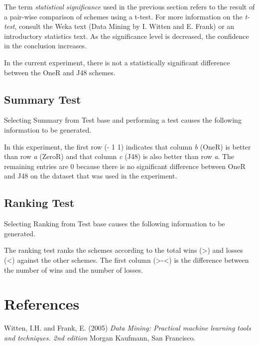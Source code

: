 \documentclass[a4paper]{article}
\begin{document}
The term \textit{statistical significance} used in the previous section refers to the result of a pair-wise comparison of schemes using a t-test. For more information on the \textit{t-test}, consult the Weka text (Data Mining by I. Witten and E. Frank) or an introductory statistics text. As the significance level is decreased, the confidence in the conclusion increases.

In the current experiment, there is not a statistically significant difference between the OneR and J48 schemes.


\subsection{Summary Test}

Selecting Summary from Test base and performing a test causes the following information to be generated.
\begin{center}
\end{center}

In this experiment, the first row (- 1 1) indicates that column \textit{b} (OneR) is better than row \textit{a} (ZeroR) and that column \textit{c} (J48) is also better than row \textit{a}. The remaining entries are 0 because there is no significant difference between OneR and J48 on the dataset that was used in the experiment.


\subsection{Ranking Test}

Selecting Ranking from Test base causes the following information to be generated.
\begin{center}
\end{center}

The ranking test ranks the schemes according to the total wins (>) and losses (<) against the other schemes. The first column (>-<) is the difference between the number of wins and the number of losses. 

\newpage
\section*{References}

Witten, I.H. and Frank, E. (2005) \textit{Data Mining: Practical machine
learning tools and techniques. 2nd edition}  Morgan Kaufmann, San
Francisco.
\end{document}
